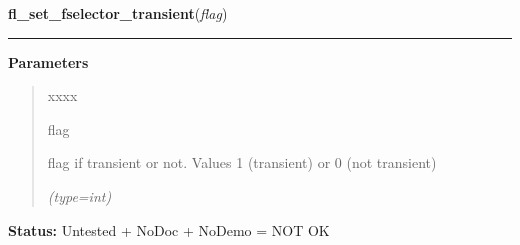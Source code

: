 \hspace{.8\funcindent}\begin{boxedminipage}{\funcwidth}

    \raggedright \textbf{fl\_set\_fselector\_transient}(\textit{flag})

    \vspace{-1.5ex}

    \rule{\textwidth}{0.5\fboxrule}
\setlength{\parskip}{2ex}
\setlength{\parskip}{1ex}
      \textbf{Parameters}
      \vspace{-1ex}

      \begin{quote}
        \begin{Ventry}{xxxx}

          \item[flag]

          flag if transient or not. Values 1 (transient) or 0 (not 
          transient)

            {\it (type=int)}

        \end{Ventry}

      \end{quote}

\textbf{Status:} Untested + NoDoc + NoDemo = NOT OK



    \end{boxedminipage}

    \label{xformslib:flgoodies:fl_set_fselector_callback}

    \vspace{0.5ex}

